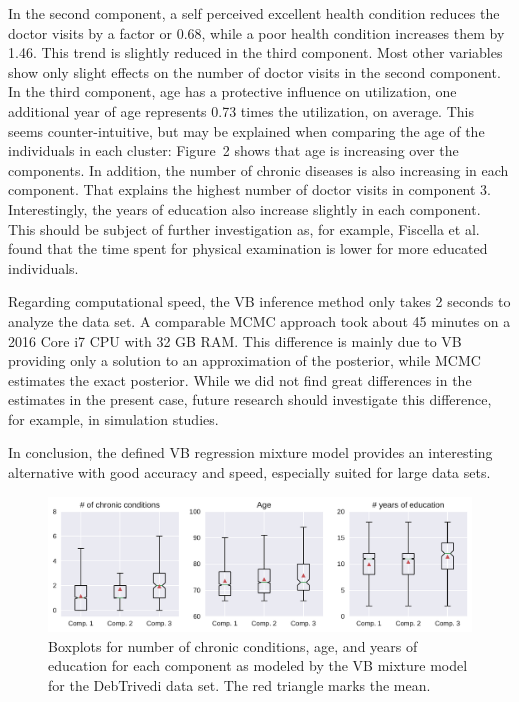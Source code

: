 \documentclass[a4paper,UKenglish]{oasics-v2016}
\begin{document}
In the second component, a self perceived excellent health condition reduces the doctor visits by a factor or 0.68, while a poor health condition increases them by 1.46. This trend is slightly reduced in the third component. Most other variables show only slight effects on the number of doctor visits in the second component. In the third component, age has a protective influence on utilization, one additional year of age represents 0.73 times the utilization, on average. This seems counter-intuitive, but may be explained when comparing the age of the individuals in each cluster: Figure~2 shows that age is increasing over the components. In addition, the number of chronic diseases is also increasing in each component. That explains the highest number of doctor visits in component 3. Interestingly, the years of education also increase slightly in each component. This should be subject of further investigation as, for example, Fiscella et al.~\cite{fiscella} found that the time spent for physical examination is lower for more educated individuals.

Regarding computational speed, the VB inference method only takes 2 seconds to analyze the data set. A comparable MCMC approach took about 45 minutes on a 2016 Core i7 CPU with 32 GB RAM. This difference is mainly due to VB providing only a solution to an approximation of the posterior, while MCMC estimates the exact posterior. While we did not find great differences in the estimates in the present case, future research should investigate this difference, for example, in simulation studies.

In conclusion, the defined VB regression mixture model provides an interesting alternative with good accuracy and speed, especially suited for large data sets.

\begin{figure}[!ht]\centering
	\includegraphics[width=\linewidth]{boxplot.pdf}
	\caption{\label{boxplot} Boxplots for number of chronic conditions, age, and years of education for each component as modeled by the VB mixture model for the DebTrivedi data set. The red triangle marks the mean.}
\end{figure}
\end{document}
